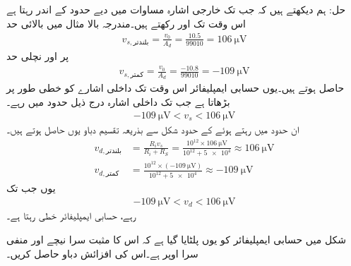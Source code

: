 حل: ہم دیکھتے ہیں کہ جب تک خارجی اشارہ مساوات  میں دیے حدود کے اندر رہتا ہے اس وقت تک  اور    رکھتے ہیں۔مندرجہ بالا مثال میں بالائی حد
\begin{align*}
v_{s,\text{بلندتر}}= \frac{v_0}{A_d}=\frac{10.5}{99010}=\SI{106}{\micro\volt}
\end{align*}
پر اور نچلی حد
\begin{align*}
v_{s,\text{کمتر}}= \frac{v_0}{A_d}=\frac{-10.8}{99010}=\SI{-109}{\micro\volt}
\end{align*}
حاصل ہوتے ہیں۔یوں حسابی ایمپلیفائر اس وقت تک داخلی اشارے کو خطی طور پر بڑھاتا ہے جب تک داخلی اشارہ درج ذیل حدود میں رہے۔
\begin{align*}
\SI{-109}{\micro\volt} < v_s < \SI{106}{\micro\volt} 
\end{align*} 
ان حدود میں رہتے ہوئے  کے حدود شکل  سے بذریعہ تقسیم دباو یوں حاصل ہوتے ہیں۔
\begin{align*}
v_{d,\text{بلندتر}}&=\frac{R_i v_s}{R_i+R_S}=\frac{10^{12} \times \SI{106}{\micro\volt}}{10^{12}+\num{5e4}} \approx \SI{106}{\micro\volt}\\
v_{d,\text{کمتر}}&=\frac{10^{12} \times (\SI{-109}{\micro\volt})}{10^{12}+\num{5e4}} \approx \SI{-109}{\micro\volt}
\end{align*}
یوں جب تک 
\begin{align}\label{مساوات_حسابی_خطی_حدود_داخلی_اشارہ}
\SI{-109}{\micro\volt} < v_d < \SI{106}{\micro\volt}
\end{align} 
رہے، حسابی ایمپلیفائر خطی رہتا ہے۔ 

شکل  میں حسابی ایمپلیفائر کو یوں پلٹایا گیا ہے کہ اس کا مثبت سرا نیچے اور منفی سرا اوپر ہے۔اس کی افزائش دباو  حاصل کریں۔

